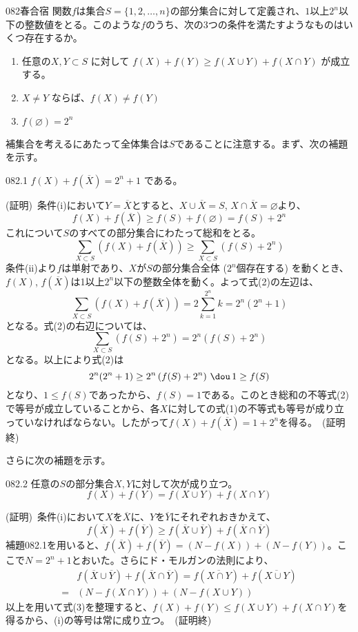 \begin{thm}{082}{}{春合宿}
 関数$f$は集合$S=\{1, 2, \dots, n\}$の部分集合に対して定義され、$1$以上$2^n$以下の整数値をとる。このような$f$のうち、次の3つの条件を満たすようなものはいくつ存在するか。
 \begin{enumerate}
  \renewcommand{\labelenumi}{\arabic{enumi}.}
  \item 任意の$X, Y \subset S$ に対して $f(X)+f(Y) \ge f(X\cup Y)+f(X\cap Y)$ が成立する。
  \item $X \neq Y$ ならば、$f(X)\neq f(Y)$
  \item $f(\varnothing)=2^n$
 \end{enumerate}
\end{thm}

補集合を考えるにあたって全体集合は$S$であることに注意する。まず、次の補題を示す。
\begin{subthm}{082.1}
 $f(X)+f(\overline{X})=2^n+1$ である。
\end{subthm}

(証明)~条件(i)において$Y=\overline{X}$とすると、$X\cup\overline{X}=S$, $X\cap\overline{X}=\varnothing$より、
\[ f(X)+f(\overline{X})\ge f(S)+f(\varnothing)=f(S)+2^n \tag{1} \]
これについて$S$のすべての部分集合にわたって総和をとる。
\[ \sum_{X\subset S}\left(f(X)+f(\overline{X})\right)\ge\sum_{X\subset S} \left(f(S)+2^n\right) \tag{2} \]
条件(ii)より$f$は単射であり、$X$が$S$の部分集合全体 ($2^n$個存在する) を動くとき、$f(X)$, $f(\overline{X})$は1以上$2^n$以下の整数全体を動く。よって式(2)の左辺は、
\[ \sum_{X\subset S}\left(f(X)+f(\overline{X})\right)=2\sum_{k=1}^{2^n}k = 2^n(2^n+1) \]
となる。式(2)の右辺については、
\[ \sum_{X\subset S}\left(f(S)+2^n\right) = 2^n\left(f(S)+2^n\right) \]
となる。以上により式(2)は
\[ 2^n(2^n+1) \ge 2^n\left(f(S)+2^n \right) \,\dou\, 1\ge f(S) \]
となり、$1\le f(S)$であったから、$f(S)=1$である。このとき総和の不等式(2)で等号が成立していることから、各$X$に対しての式(1)の不等式も等号が成り立っていなければならない。したがって$f(X)+f(\overline{X})=1+2^n$を得る。~(証明終)

さらに次の補題を示す。
\begin{subthm}{082.2}
 任意の$S$の部分集合$X, Y$に対して次が成り立つ。
 \[ f(X)+f(Y)=f(X\cup Y)+f(X\cap Y)  \]
\end{subthm}
(証明)~条件(i)において$X$を$\overline{X}$に、$Y$を$\overline{Y}$にそれぞれおきかえて、
\[ f(\overline{X})+f(\overline{Y})\ge f(\overline{X}\cup\overline{Y})+f(\overline{X}\cap\overline{Y}) \tag{3} \]
補題082.1を用いると、$f(\overline{X})+f(\overline{Y})=(N-f(X))+(N-f(Y))$。ここで$N=2^n+1$とおいた。さらにド・モルガンの法則により、
\begin{align*}
 &f(\overline{X}\cup\overline{Y})+f(\overline{X}\cap\overline{Y})=f(\overline{X\cap Y})+f(\overline{X\cup Y}) \\
 =&(N-f(X\cap Y))+(N-f(X\cup Y))
\end{align*}
以上を用いて式(3)を整理すると、$f(X)+f(Y)\le f(X\cup Y)+f(X\cap Y)$を得るから、(i)の等号は常に成り立つ。~(証明終)

